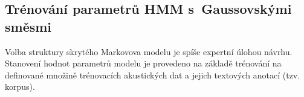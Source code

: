 






\subsection{Trénování parametrů HMM s~Gaussovskými směsmi}
\label{chap:asr:acoustic:GMM}

Volba struktury skrytého Markovova modelu je spíše expertní úlohou návrhu. Stanovení hodnot parametrů modelu je provedeno na základě trénování
na definované množině trénovacích akustických dat a jejich textových anotací (tzv. korpus).

